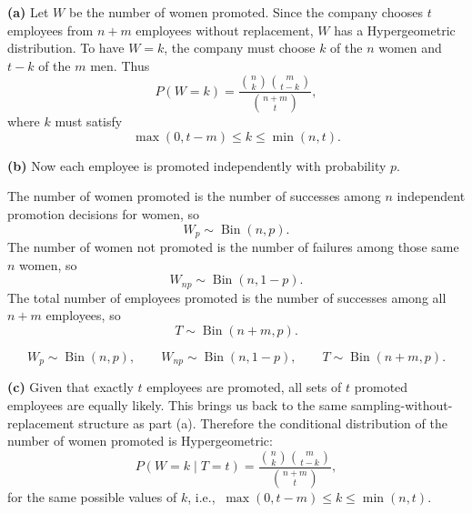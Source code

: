 \documentclass[11pt]{article}
\begin{document}
\begin{solutionbox}
\textbf{(a)} Let $W$ be the number of women promoted. Since the company chooses $t$ employees from $n+m$ employees without replacement, $W$ has a Hypergeometric distribution. To have $W=k$, the company must choose $k$ of the $n$ women and $t-k$ of the $m$ men. Thus
\[
P(W=k)=\frac{\binom{n}{k}\binom{m}{t-k}}{\binom{n+m}{t}},
\]
where $k$ must satisfy
\[
\max(0,t-m)\le k\le \min(n,t).
\]
 

\textbf{(b)} Now each employee is promoted independently with probability $p$.

The number of women promoted is the number of successes among $n$ independent promotion decisions for women, so
\[
W_p\sim \operatorname{Bin}(n,p).
\]
The number of women not promoted is the number of failures among those same $n$ women, so
\[
W_{np}\sim \operatorname{Bin}(n,1-p).
\]
The total number of employees promoted is the number of successes among all $n+m$ employees, so
\[
T\sim \operatorname{Bin}(n+m,p).
\]

\begin{finalanswerbox}
\[
W_p\sim \operatorname{Bin}(n,p),
\qquad
W_{np}\sim \operatorname{Bin}(n,1-p),
\qquad
T\sim \operatorname{Bin}(n+m,p).
\]
\end{finalanswerbox}

\textbf{(c)} Given that exactly $t$ employees are promoted, all sets of $t$ promoted employees are equally likely. This brings us back to the same sampling-without-replacement structure as part (a). Therefore the conditional distribution of the number of women promoted is Hypergeometric:
\[
P(W=k\mid T=t)=\frac{\binom{n}{k}\binom{m}{t-k}}{\binom{n+m}{t}},
\]
for the same possible values of $k$, i.e.,  $\ \max(0,t-m)\le k\le \min(n,t).$

 
\end{solutionbox}
\end{document}
